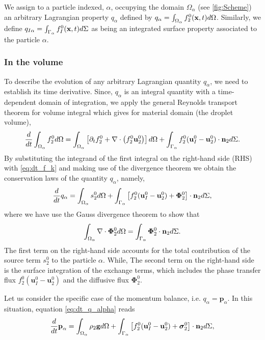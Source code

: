 We assign to a particle indexed, $\alpha$, occupying the domain $\Omega_\alpha$ (see \ref{fig:Scheme}) an arbitrary Lagrangian property $q_\alpha$ defined by $q_\alpha  = \int_{\Omega_\alpha}  f_2^0(\textbf{x},t)  d\Omega$.
Similarly, we define $q_{I\alpha} = \int_{\Gamma_\alpha}  f_I^0(\textbf{x},t)  d\Sigma$ as being an integrated surface property associated to the particle $\alpha$.
\subsubsection*{In the volume }
To describe the evolution of any arbitrary Lagrangian quantity $q_\alpha$, we need to establish its time derivative.
Since, $q_\alpha$ is an integral quantity with a time-dependent domain of integration, we apply the general Reynolds transport theorem for volume integral which gives for material domain (the droplet volume),
\begin{equation}
    \frac{d}{d t}  \int_{\Omega_\alpha} f_2^0 d\Omega
    = \int_{\Omega_\alpha} \left[ \partial_t f_2^0 + \mathbf{\nabla}\cdot\left(f_2^0\textbf{u}_2^0\right) \right] d\Omega\\
    + \int_{\Gamma_\alpha}  f_2^0 (\textbf{u}_I^0-\textbf{u}_2^0)\cdot \textbf{n}_2  d\Sigma.
    \label{eq:reynolds_transport}
\end{equation}
By substituting the integrand of the first integral on the right-hand side (RHS) with \ref{eq:dt_f_k} and making use of the divergence theorem we obtain the conservation laws of the quantity $q_\alpha$, namely,  
\begin{equation}
    \frac{d}{d t}  q_\alpha
    = \int_{\Omega_\alpha}  s_2^0  d\Omega
    + \int_{\Gamma_\alpha}  \left[
        f_2^0 (\textbf{u}_I^0-\textbf{u}_2^0) 
        + \mathbf{\Phi}_2^0 
        \right] \cdot \textbf{n}_2  d\Sigma,
    \label{eq:dt_q_alpha}
\end{equation}
where we have use the Gauss divergence theorem to show that
\begin{equation}
    \int_{\Omega_\alpha} \mathbf{\nabla}\cdot \mathbf{\Phi}_2^0 d\Omega = \int_{\Gamma_\alpha} \mathbf{\Phi}_2^0 \cdot \textbf{n}_2 d\Sigma.
\end{equation}
The first term on the right-hand side accounts for the total contribution of the source term $s_2^0$ to the particle $\alpha$.
While, The second term on the right-hand side is the surface integration of the exchange terms, which includes the phase transfer flux $f_2^0 (\textbf{u}_I^0-\textbf{u}_2^0)$ and the diffusive flux $\mathbf{\Phi}_2^0$. 


Let us consider the specific case of the momentum balance, i.e. $q_\alpha = \textbf{p}_\alpha$.
In this situation, equation \eqref{eq:dt_q_alpha} reads
\begin{equation}
    \ddt  \textbf{p}_\alpha
    = \intO{ \rho_2\textbf{g} }
    + \intS{ \left[
        f_2^0 (\textbf{u}_I^0-\textbf{u}_2^0)
        + \bm{\sigma}_2^0%
        \right] \cdot \textbf{n}_2 },
\end{equation}

